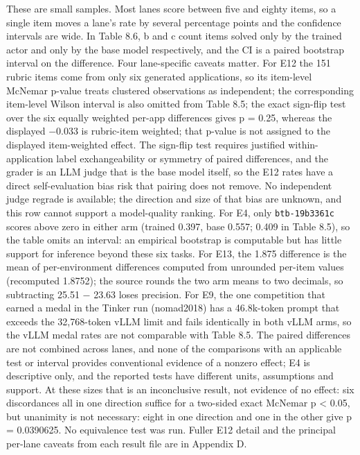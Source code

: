 \documentclass[12pt,a4paper]{report}
\begin{document}
These are small samples. Most lanes score between five and eighty items,
so a single item moves a lane's rate by several percentage points and
the confidence intervals are wide. In Table 8.6, b and c count items
solved only by the trained actor and only by the base model
respectively, and the CI is a paired bootstrap interval on the
difference. Four lane-specific caveats matter. For E12 the 151 rubric
items come from only six generated applications, so its item-level
McNemar p-value treats clustered observations as independent; the
corresponding item-level Wilson interval is also omitted from Table 8.5;
the exact sign-flip test over the six equally weighted per-app
differences gives p = 0.25, whereas the displayed −0.033 is rubric-item
weighted; that p-value is not assigned to the displayed item-weighted
effect. The sign-flip test requires justified within-application label
exchangeability or symmetry of paired differences, and the grader is an
LLM judge that is the base model itself, so the E12 rates have a direct
self-evaluation bias risk that pairing does not remove. No independent
judge regrade is available; the direction and size of that bias are
unknown, and this row cannot support a model-quality ranking. For E4,
only \texttt{btb-19b3361c} scores above zero in either arm (trained
0.397, base 0.557; 0.409 in Table 8.5), so the table omits an interval:
an empirical bootstrap is computable but has little support for
inference beyond these six tasks. For E13, the 1.875 difference is the
mean of per-environment differences computed from unrounded per-item
values (recomputed 1.8752); the source rounds the two arm means to two
decimals, so subtracting 25.51 − 23.63 loses precision. For E9, the one
competition that earned a medal in the Tinker run (nomad2018) has a
46.8k-token prompt that exceeds the 32,768-token vLLM limit and fails
identically in both vLLM arms, so the vLLM medal rates are not
comparable with Table 8.5. The paired differences are not combined
across lanes, and none of the comparisons with an applicable test or
interval provides conventional evidence of a nonzero effect; E4 is
descriptive only, and the reported tests have different units,
assumptions and support. At these sizes that is an inconclusive result,
not evidence of no effect: six discordances all in one direction suffice
for a two-sided exact McNemar p \textless{} 0.05, but unanimity is not
necessary: eight in one direction and one in the other give p =
0.0390625. No equivalence test was run. Fuller E12 detail and the
principal per-lane caveats from each result file are in Appendix D.
\end{document}
